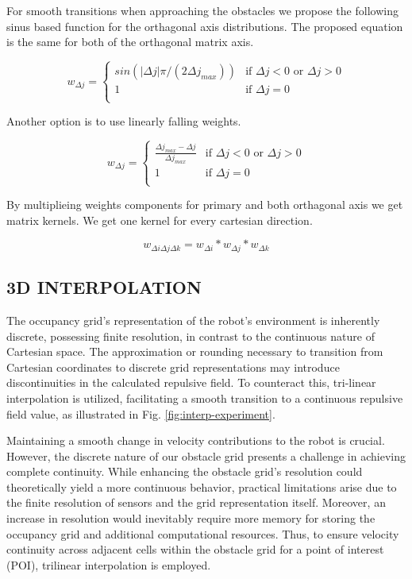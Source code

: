 \documentclass[letterpaper, 10 pt, conference]{ieeeconf}  %
\begin{document}
For smooth transitions when approaching the obstacles we propose the following sinus based function for the orthagonal axis distributions. The proposed equation is the same for both of the orthagonal matrix axis.

\begin{equation}
	w_{\Delta j} =
	\begin{cases} 
		sin(\left| \Delta j \right| \pi / (2 \Delta j_{max})) & \text{if } \Delta j < 0 \text{~or }  \Delta j > 0 \\
		1 & \text{if } \Delta j = 0 \\
	\end{cases}
\end{equation}

Another option is to use linearly falling weights.

\begin{equation}
	w_{\Delta j} =
	\begin{cases} 
		\frac{\Delta j_{max} - \Delta j }{\Delta j_{max}} & \text{if } \Delta j < 0 \text{~or }  \Delta j > 0 \\
		1 & \text{if } \Delta j = 0 \\
	\end{cases}
\end{equation}


By multiplieing weights components for primary and both orthagonal axis we get matrix kernels. We get one kernel for every cartesian direction.

\begin{equation}
	w_{\Delta i \Delta j \Delta k} = w_{\Delta i} * w_{\Delta j} * w_{\Delta k}
\end{equation}

\subsection{3D INTERPOLATION} 

The occupancy grid's representation of the robot's environment is inherently discrete, possessing finite resolution, in contrast to the continuous nature of Cartesian space. The approximation or rounding necessary to transition from Cartesian coordinates to discrete grid representations may introduce discontinuities in the calculated repulsive field. To counteract this, tri-linear interpolation is utilized, facilitating a smooth transition to a continuous repulsive field value, as illustrated in Fig. \ref{fig:interp-experiment}.

Maintaining a smooth change in velocity contributions to the robot is crucial. However, the discrete nature of our obstacle grid presents a challenge in achieving complete continuity. While enhancing the obstacle grid's resolution could theoretically yield a more continuous behavior, practical limitations arise due to the finite resolution of sensors and the grid representation itself. Moreover, an increase in resolution would inevitably require more memory for storing the occupancy grid and additional computational resources. Thus, to ensure velocity continuity across adjacent cells within the obstacle grid for a point of interest (POI), trilinear interpolation is employed.
\end{document}
